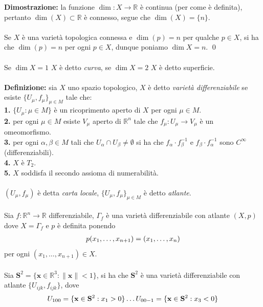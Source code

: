 \documentclass{article}
\begin{document}
\textbf{Dimostrazione:} la funzione $\dim : X \longrightarrow \mathbb{R}$ è continua (per come è definita), pertanto $\dim (X) \subset \mathbb{R}$ è connesso, segue che $\dim(X) = \{ n \}$. \\ \\
Se $X$ è una varietà topologica connessa e $\dim (p) = n$ per qualche $p \in X$, si ha che $\dim (p) = n$ per ogni $p \in X$, dunque poniamo $\dim X = n$. \qed \\ \\
Se $\dim X = 1$ $X$ è detto \textit{curva}, se $\dim X = 2$ $X$ è detto superficie. \\ \\
\textbf{Definizione:} sia $X$ uno spazio topologico, $X$ è detto \textit{varietà differenziabile} se esiste $\{ U_\mu, f_\mu \}_{\mu \in M}$ tale che: \\
\textbf{1.} $\{ U_\mu : \mu \in M \}$ è un ricoprimento aperto di $X$ per ogni $\mu \in M$. \\
\textbf{2.} per ogni $\mu \in M$ esiste $V_\mu$ aperto di $\mathbb{R}^n$ tale che $f_\mu : U_\mu \longrightarrow V_\mu$ è un omeomorfismo. \\
\textbf{3.} per ogni $\alpha, \beta \in M$ tali che $U_\alpha \cap U_\beta \neq \emptyset$ si ha che $f_\alpha \cdot f^{-1}_\beta$ e $f_\beta \cdot f^{-1}_\alpha$ sono $C^{\infty}$ (differenziabili). \\
\textbf{4.} $X$ è $T_2$. \\
\textbf{5.} $X$ soddisfa il secondo assioma di numerabilità. \\ \\
$(U_\mu, f_\mu)$ è detta \textit{carta locale}, $\{ U_\mu, f_\mu \}_{\mu \in M}$ è detto \textit{atlante}. \\ \\
Sia $f : \mathbb{R}^n \longrightarrow \mathbb{R}$ differenziabile, $\Gamma_f$ è una varietà differenziabile con atlante $(X, p)$ dove $X = \Gamma_f$ e $p$ è definita ponendo
\begin{gather}
    p(x_1, \dots, x_{n + 1}) = (x_1, \dots, x_n) \notag
\end{gather} 
per ogni $(x_1, \dots, x_{n + 1}) \in X$. \\ \\
Sia $\mathbf{S}^2 = \{ \mathbf{x} \in \mathbb{R}^3 : \| \mathbf{x} \| < 1 \}$, si ha che $\mathbf{S}^2$ è una varietà differenziabile con atlante $\{ U_{ijk}, f_{ijk} \}$, dove
\begin{gather}
    U_{100} = \{ \mathbf{x} \in \mathbf{S}^2 : x_1 > 0 \} \dots U_{00-1} = \{ \mathbf{x} \in \mathbf{S}^2 : x_3 < 0 \} \notag
\end{gather}
\end{document}
